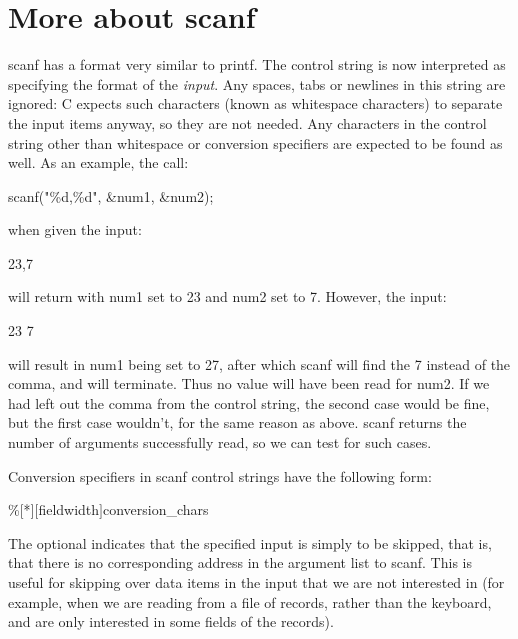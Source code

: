 \section{More about {\cd scanf}}

     {\cd scanf} has  a format  very  similar to {\cd printf}.  The
control  string is now interpreted as  specifying the  format of the 
{\em input}.  Any  spaces,  tabs  or newlines in  this string  are
ignored:  C expects  such characters  (known  as {\kc whitespace
characters})  to separate  the input  items anyway,  so they are not
needed. Any  characters  in  the  control  string  other  than 
whitespace  or conversion specifiers  are expected  to be  found as 
well. As an example, the call:
\begin{code}
scanf("\%d,\%d", \&num1, \&num2);
\end{code}
\noindent
     when given the input:
\begin{code}
23,7
\end{code}
\noindent
     will return with {\cd num1} set to 23 and {\cd num2} set to 7.
However, the input:
\begin{code}
23 7
\end{code}
\noindent
     will result  in {\cd num1}  being set  to 27, after which {\cd
scanf} will find the 7 instead of  the comma,  and will  terminate.
Thus no value will have been read for {\cd num2}.  If we  had left 
out the  comma from the control string, the second case would be
fine, but the first case wouldn't, for the same reason as above. 
{\cd scanf} returns the number of arguments successfully read, so we
can test for such cases.

Conversion specifiers in 
{\cd scanf} control strings have the
following form:
\begin{code}
\%$[$*$][${\ms fieldwidth\/}$]${\ms conversion\_chars}
\end{code}
\noindent
     The optional  {\cd *} indicates  that the  specified  input  is 
simply  to  be skipped, that  is, that there is no corresponding
address in the argument list to {\cd scanf}. This is useful for
skipping over data items in the input that we are not interested  in
(for  example, when  we are reading from a file of records, rather
than  the keyboard,  and are  only interested  in some  fields  of 
the records).

